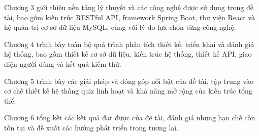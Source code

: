 \documentclass[../DoAn.tex]{subfiles}
\begin{document}
Chương 3 giới thiệu nền tảng lý thuyết và các công nghệ được sử dụng trong đề tài, bao gồm kiến trúc RESTful API, framework Spring Boot, thư viện React và hệ quản trị cơ sở dữ liệu MySQL, cùng với lý do lựa chọn từng công nghệ.

Chương 4 trình bày toàn bộ quá trình phân tích thiết kế, triển khai và đánh giá hệ thống, bao gồm thiết kế cơ sở dữ liệu, kiến trúc hệ thống, thiết kế API, giao diện người dùng và kết quả kiểm thử.

Chương 5 trình bày các giải pháp và đóng góp nổi bật của đề tài, tập trung vào cơ chế thiết kế hệ thống quiz linh hoạt và khả năng mở rộng của kiến trúc tổng thể.

Chương 6 tổng kết các kết quả đạt được của đề tài, đánh giá những hạn chế còn tồn tại và đề xuất các hướng phát triển trong tương lai.
\end{document}
